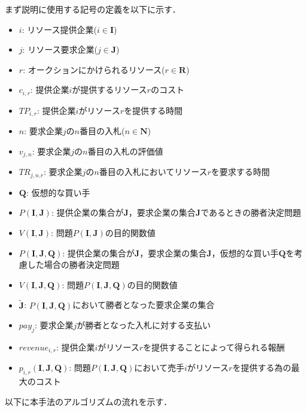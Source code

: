 まず説明に使用する記号の定義を以下に示す．

\begin{itemize}
\tightlist
\item
  \(i\): リソース提供企業(\(i \in \boldsymbol{I}\))
\item
  \(j\): リソース要求企業(\(j \in \boldsymbol{J}\))
\item
  \(r\): オークションにかけられるリソース(\(r \in \boldsymbol{R}\))
\item
  \(c_{i,r}\): 提供企業\(i\)が提供するリソース\(r\)のコスト
\item
  \(TP_{i,r}\): 提供企業\(i\)がリソース\(r\)を提供する時間
\item
  \(n\): 要求企業\(j\)の\(n\)番目の入札(\(n \in \boldsymbol{N}\))
\item
  \(v_{j,n}\): 要求企業\(j\)の\(n\)番目の入札の評価値
\item
  \(TR_{j,n.r}\):
  要求企業\(j\)の\(n\)番目の入札においてリソース\(r\)を要求する時間
\item
  \(\boldsymbol{Q}\): 仮想的な買い手
\item
  \(P(\boldsymbol{I},\boldsymbol{J})\):
  提供企業の集合が\(\boldsymbol{J}\)，要求企業の集合\(\boldsymbol{J}\)であるときの勝者決定問題
\item
  \(V(\boldsymbol{I},\boldsymbol{J})\):
  問題\(P(\boldsymbol{I},\boldsymbol{J})\)の目的関数値
\item
  \(P(\boldsymbol{I},\boldsymbol{J},\boldsymbol{Q})\):
  提供企業の集合が\(\boldsymbol{J}\)，要求企業の集合\(\boldsymbol{J}\)，仮想的な買い手\(\boldsymbol{Q}\)を考慮した場合の勝者決定問題
\item
  \(V(\boldsymbol{I},\boldsymbol{J},\boldsymbol{Q})\):
  問題\(P(\boldsymbol{I},\boldsymbol{J},\boldsymbol{Q})\)の目的関数値
\item
  \(\boldsymbol{\tilde{J}}\):
  \(P(\boldsymbol{I},\boldsymbol{J},\boldsymbol{Q})\)において勝者となった要求企業の集合
\item
  \(pay_j\): 要求企業\(j\)が勝者となった入札に対する支払い
\item
  \(revenue_{i,r}\):
  提供企業\(i\)がリソース\(r\)を提供することによって得られる報酬
\item
  \(p_{i,r}(\boldsymbol{I},\boldsymbol{J},\boldsymbol{Q})\):
  問題\(P(\boldsymbol{I},\boldsymbol{J},\boldsymbol{Q})\)において売手\(i\)がリソース\(r\)を提供する為の最大のコスト
\end{itemize}

以下に本手法のアルゴリズムの流れを示す．

